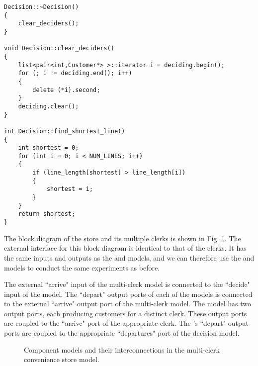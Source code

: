\begin{verbatim}
Decision::~Decision()
{
    clear_deciders();
}

void Decision::clear_deciders()
{
    list<pair<int,Customer*> >::iterator i = deciding.begin();
    for (; i != deciding.end(); i++)
    {
        delete (*i).second;
    }
    deciding.clear();
}

int Decision::find_shortest_line()
{
    int shortest = 0;
    for (int i = 0; i < NUM_LINES; i++)
    {
        if (line_length[shortest] > line_length[i])
        {
            shortest = i;
        }
    }
    return shortest;
}
\end{verbatim}

The block diagram of the store and its multiple clerks is shown in Fig. \ref{fig:multi_clerk_diagram}. The external interface for this block diagram is identical to that of the clerks. It has the same inputs and outputs as the  and  models, and we can therefore use the  and  models to conduct the same experiments as before.

The external ``arrive" input of the multi-clerk model is connected to the ``decide" input of the  model. The ``depart" output ports of each of the  models is connected to the external ``arrive" output port of the multi-clerk model. The  model has two output ports, each producing customers for a distinct clerk. These output ports are coupled to the ``arrive" port of the appropriate clerk. The 's ``depart" output ports are coupled to the appropriate ``departures" port of the decision model.
\begin{figure}[ht]
\centering
{}
\caption{Component models and their interconnections in the multi-clerk convenience store model.}
\label{fig:multi_clerk_diagram}
\end{figure}    

